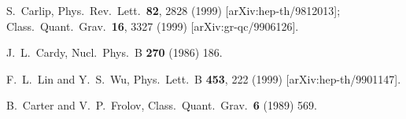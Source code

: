 \documentclass[a4paper,12pt]{article}
\begin{document}
\begin{thebibliography}{99}
S.~Carlip,
Phys.\ Rev.\ Lett.\  {\bf 82}, 2828 (1999)
[arXiv:hep-th/9812013]; 
Class.\ Quant.\ Grav.\  {\bf 16}, 3327 (1999)
[arXiv:gr-qc/9906126].

J.~L.~Cardy,
Nucl.\ Phys.\ B {\bf 270} (1986) 186.


F.~L.~Lin and Y.~S.~Wu,
Phys.\ Lett.\ B {\bf 453}, 222 (1999)
[arXiv:hep-th/9901147].

B.~Carter and V.~P.~Frolov,
Class.\ Quant.\ Grav.\  {\bf 6} (1989) 569.


\end{thebibliography}
\end{document}
